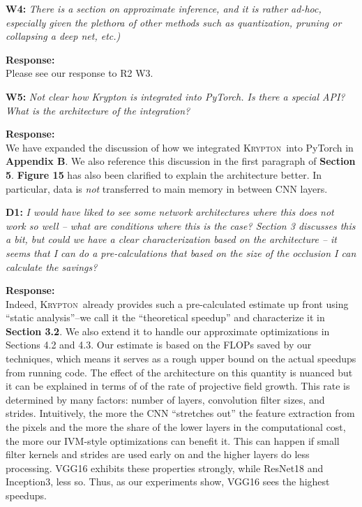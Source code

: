 \documentclass[preprint]{vldb}
\newcommand{\system}{\textsc{Krypton}}
\begin{document}
\vspace{2mm}
\noindent \textbf{W4:} \textit{There is a section on approximate inference, and it is rather ad-hoc, especially given the plethora of other methods such as quantization, pruning or collapsing a deep net, etc.)}

\vspace{2mm}
\noindent \textbf{Response:}\\
Please see our response to R2 W3.

\vspace{2mm}
\noindent \textbf{W5:} \textit{Not clear how Krypton is integrated into PyTorch. Is there a special API? What is the architecture of the integration?}

\vspace{2mm}
\noindent \textbf{Response:}\\
We have expanded the discussion of how we integrated \system ~into PyTorch in \textbf{Appendix B}. We also reference this discussion in the first paragraph of \textbf{Section 5}. \textbf{Figure 15} has also been clarified to explain the architecture better. In particular, data is \textit{not} transferred to main memory in between CNN layers.

\vspace{2mm}
\noindent \textbf{D1:} \textit{I would have liked to see some network architectures where this does not work so well -- what are conditions where this is the case? Section 3 discusses this a bit, but could we have a clear characterization based on the architecture -- it seems that I can do a pre-calculations that based on the size of the occlusion I can calculate the savings?}

\vspace{2mm}
\noindent \textbf{Response:}\\
Indeed, \system ~already provides such a pre-calculated estimate up front using ``static analysis''--we call it the ``theoretical speedup'' and characterize it in \textbf{Section 3.2}. We also extend it to handle our approximate optimizations in Sections 4.2 and 4.3. Our estimate is based on the FLOPs saved by our techniques, which means it serves as a rough upper bound on the actual speedups from running code. The effect of the architecture on this quantity is nuanced but it can be explained in terms of of the rate of projective field growth. This rate is determined by many factors: number of layers, convolution filter sizes, and strides. Intuitively, the more the CNN ``stretches out'' the feature extraction from the pixels and the more the share of the lower layers in the computational cost, the more our IVM-style optimizations can benefit it. This can happen if small filter kernels and strides are used early on and the higher layers do less processing. VGG16 exhibits these properties strongly, while ResNet18 and Inception3, less so. Thus, as our experiments show, VGG16 sees the highest speedups.
\end{document}
